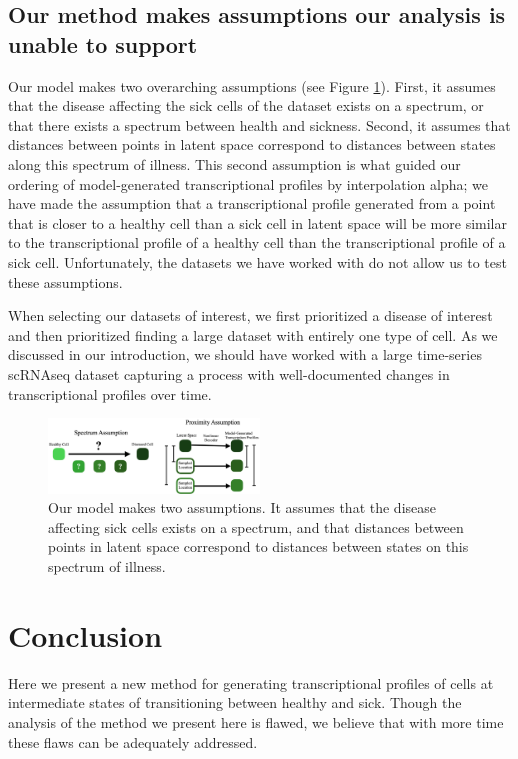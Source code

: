 \documentclass{article}
\begin{document}
\subsection{Our method makes assumptions our analysis is unable to support}
Our model makes two overarching assumptions (see Figure \ref{assumptions}).
First, it assumes that the disease affecting the sick cells of the dataset exists on a spectrum, or that there exists a spectrum between health and sickness.
Second, it assumes that distances between points in latent space correspond to distances between states along this spectrum of illness.
This second assumption is what guided our ordering of model-generated transcriptional profiles by interpolation alpha; we have made the assumption that a transcriptional profile generated from a point that is closer to a healthy cell than a sick cell in latent space will be more similar to the transcriptional profile of a healthy cell than the transcriptional profile of a sick cell.
Unfortunately, the datasets we have worked with do not allow us to test these assumptions.

When selecting our datasets of interest, we first prioritized a disease of interest and then prioritized finding a large dataset with entirely one type of cell.
As we discussed in our introduction, we should have worked with a large time-series scRNAseq dataset capturing a process with well-documented changes in transcriptional profiles over time.


\begin{figure}
  \centering
  \includegraphics[width=0.5\textwidth]{assumptions.jpg}
  \caption{Our model makes two assumptions.
  It assumes that the disease affecting sick cells exists on a spectrum, and that distances between points in latent space correspond to distances between states on this spectrum of illness.}
  \label{assumptions}
\end{figure}

\section{Conclusion}
Here we present a new method for generating transcriptional profiles of cells at intermediate states of transitioning between healthy and sick.
Though the analysis of the method we present here is flawed, we believe that with more time these flaws can be adequately addressed.



{
\small
\printbibliography
}
\end{document}
